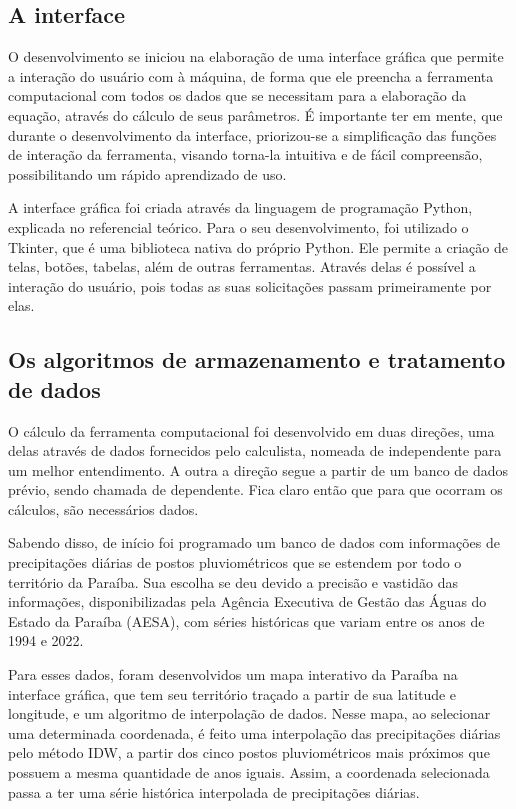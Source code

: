 \subsection{A interface}

O desenvolvimento se iniciou na elaboração de uma interface gráfica que permite a interação do usuário com à máquina, de forma que ele preencha a ferramenta computacional com todos os dados que se necessitam para a elaboração da equação, através do cálculo de seus parâmetros. É importante ter em mente, que durante o desenvolvimento da interface, priorizou-se a simplificação das funções de interação da ferramenta, visando torna-la intuitiva e de fácil compreensão, possibilitando um rápido aprendizado de uso.

A interface gráfica foi criada através da linguagem de programação Python, explicada no referencial teórico. Para o seu desenvolvimento, foi utilizado o Tkinter, que é uma biblioteca nativa do próprio Python. Ele permite a criação de telas, botões, tabelas, além de outras ferramentas. Através delas é possível a interação do usuário, pois todas as suas solicitações passam primeiramente por elas.

\subsection{Os algoritmos de armazenamento e tratamento de dados}

O cálculo da ferramenta computacional foi desenvolvido em duas direções, uma delas através de dados fornecidos pelo calculista, nomeada de independente para um melhor entendimento. A outra a direção segue a partir de um banco de dados prévio, sendo chamada de dependente. Fica claro então que para que ocorram os cálculos, são necessários dados.

Sabendo disso, de início foi programado um banco de dados com informações de precipitações diárias de postos pluviométricos que se estendem por todo o território da Paraíba. Sua escolha se deu devido a precisão e vastidão das informações, disponibilizadas pela Agência Executiva de Gestão das Águas do Estado da Paraíba (AESA), com séries históricas que variam entre os anos de 1994 e 2022.

Para esses dados, foram desenvolvidos um mapa interativo da Paraíba na interface gráfica, que tem seu território traçado a partir de sua latitude e longitude, e um algoritmo de interpolação de dados. Nesse mapa, ao selecionar uma determinada coordenada, é feito uma interpolação das precipitações diárias pelo método IDW, a partir dos cinco postos pluviométricos mais próximos que possuem a mesma quantidade de anos iguais. Assim, a coordenada selecionada passa a ter uma série histórica interpolada de precipitações diárias. 

